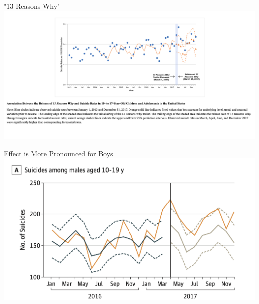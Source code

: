 \documentclass[nobackground,dvipsnames,table,aspectratio=169]{beamer}
\begin{document}
\begin{frame}{"13 Reasons Why"}
    \includegraphics[width=\textwidth]{13-reasons-why-impact-on-adolescent-suicides}
\end{frame}

\begin{frame}{Effect is More Pronounced for Boys}
    \includegraphics[width=\textwidth]{13-reasons-why-stronger-impact-on-boys}
\end{frame}
\end{document}
